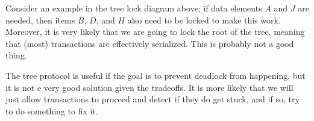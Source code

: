 Consider an example in the tree lock diagram above; if data elements $A$ and $J$ are needed, then items $B$, $D$, and $H$ also need to be locked to make this work. Moreover, it is very likely that we are going to lock the root of the tree, meaning that (most) transactions are effectively serialized. This is probably not a good thing.

The tree protocol is useful if the goal is to prevent deadlock from happening, but it is not e very good solution given the tradeoffs. It is more likely that we will just allow transactions to proceed and detect if they do get stuck, and if so, try to do something to fix it.




